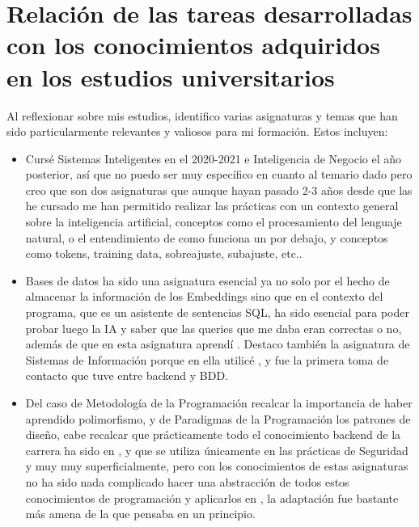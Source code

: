 \section{Relación de las tareas desarrolladas
con los conocimientos adquiridos
en los estudios universitarios}
Al reflexionar sobre mis estudios, identifico varias asignaturas y temas que han sido particularmente relevantes y valiosos para mi formación. Estos incluyen:
\begin{itemize}
    \item {} Cursé Sistemas Inteligentes en el 2020-2021 e Inteligencia de Negocio el año posterior, así que no puedo ser muy específico en cuanto al temario dado pero creo que son dos asignaturas que aunque hayan pasado 2-3 años desde que las he cursado me han permitido realizar las prácticas con un contexto general sobre la inteligencia artificial, conceptos como el procesamiento del lenguaje natural, o el entendimiento de como funciona un \href{https://en.wikipedia.org/wiki/Large_language_model}{} por debajo, y conceptos como tokens, training data, sobreajuste, subajuste, etc..
    \item {}  Bases de datos ha sido una asignatura esencial ya no solo por el hecho de almacenar la información de los Embeddings sino que en el contexto del programa, que es un asistente de sentencias SQL, ha sido esencial para poder probar luego la IA y saber que las queries que me daba eran correctas o no, además de que en esta asignatura aprendí \href{https://www.postgresql.org/}{}. Destaco también la asignatura de Sistemas de Información porque en ella utilicé \href{https://www.sqlite.org/}{}, y fue la primera toma de contacto que tuve entre backend y BDD.
    \item {} Del caso de Metodología de la Programación recalcar la importancia de haber aprendido polimorfismo, y de Paradigmas de la Programación los patrones de diseño, cabe recalcar que prácticamente todo el conocimiento backend de la carrera ha sido en \href{https://www.java.com/en/}{}, y que \href{https://dotnet.microsoft.com/es-es/languages/csharp}{} se utiliza únicamente en las prácticas de Seguridad y muy muy superficialmente, pero con los conocimientos de estas asignaturas no ha sido nada complicado hacer una abstracción de todos estos conocimientos de programación y aplicarlos en \href{https://dotnet.microsoft.com/es-es/languages/csharp}{}, la adaptación fue bastante más amena de la que pensaba en un principio. 

\end{itemize}

